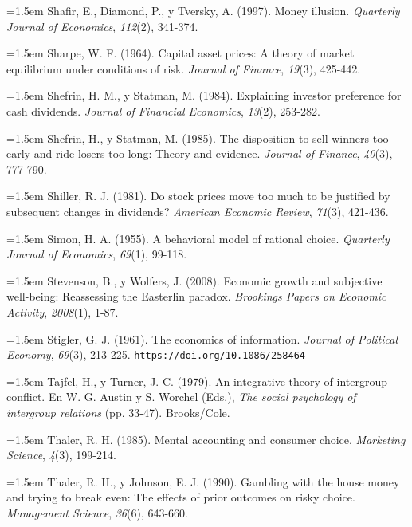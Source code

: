 \documentclass[10pt,a4paper]{article}
\begin{document}
\noindent\hangindent=1.5em Shafir, E., Diamond, P., y Tversky, A. (1997). Money illusion. \textit{Quarterly Journal of Economics}, \textit{112}(2), 341-374.

\noindent\hangindent=1.5em Sharpe, W. F. (1964). Capital asset prices: A theory of market equilibrium under conditions of risk. \textit{Journal of Finance}, \textit{19}(3), 425-442.

\noindent\hangindent=1.5em Shefrin, H. M., y Statman, M. (1984). Explaining investor preference for cash dividends. \textit{Journal of Financial Economics}, \textit{13}(2), 253-282.

\noindent\hangindent=1.5em Shefrin, H., y Statman, M. (1985). The disposition to sell winners too early and ride losers too long: Theory and evidence. \textit{Journal of Finance}, \textit{40}(3), 777-790.

\noindent\hangindent=1.5em Shiller, R. J. (1981). Do stock prices move too much to be justified by subsequent changes in dividends? \textit{American Economic Review}, \textit{71}(3), 421-436.

\noindent\hangindent=1.5em Simon, H. A. (1955). A behavioral model of rational choice. \textit{Quarterly Journal of Economics}, \textit{69}(1), 99-118.

\noindent\hangindent=1.5em Stevenson, B., y Wolfers, J. (2008). Economic growth and subjective well-being: Reassessing the Easterlin paradox. \textit{Brookings Papers on Economic Activity}, \textit{2008}(1), 1-87.

\noindent\hangindent=1.5em Stigler, G. J. (1961). The economics of information. \textit{Journal of Political Economy}, \textit{69}(3), 213-225. \href{https://doi.org/10.1086/258464}{\nolinkurl{https://doi.org/10.1086/258464}}

\noindent\hangindent=1.5em Tajfel, H., y Turner, J. C. (1979). An integrative theory of intergroup conflict. En W. G. Austin y S. Worchel (Eds.), \textit{The social psychology of intergroup relations} (pp. 33-47). Brooks/Cole.

\noindent\hangindent=1.5em Thaler, R. H. (1985). Mental accounting and consumer choice. \textit{Marketing Science}, \textit{4}(3), 199-214.

\noindent\hangindent=1.5em Thaler, R. H., y Johnson, E. J. (1990). Gambling with the house money and trying to break even: The effects of prior outcomes on risky choice. \textit{Management Science}, \textit{36}(6), 643-660.
\end{document}

